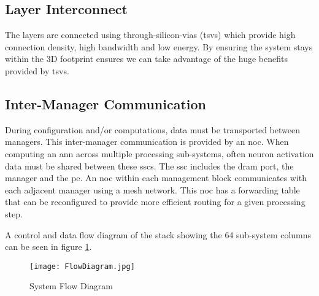 \subsection{Layer Interconnect}
\label{ssec:Layer Interconnect}

The layers are connected using through-silicon-vias (\ac{tsv}s) which provide high connection density, high bandwidth and low energy.
By ensuring the system stays within the 3D footprint ensures we can take advantage of the huge benefits provided by \ac{tsv}s.

\subsection{Inter-Manager Communication}
\label{ssec:Inter-Manager Communication}

During configuration and/or computations, data must be transported between managers. This inter-manager communication is provided by an \ac{noc}.
When computing an \ac{ann} across multiple processing sub-systems, often neuron activation data must be shared between these \ac{ssc}s. The \ac{ssc} includes the \ac{dram} port, the manager and the \ac{pe}. An \ac{noc} within each management block communicates with each adjacent manager using a mesh network. This \ac{noc} has a forwarding table that can be reconfigured to provide more efficient routing for a given processing step.

A control and data flow diagram of the stack showing the 64 sub-system columns can be seen in figure \ref{fig:FlowDiagram}.
\begin{figure}[!t]
\centering
\captionsetup{justification=centering}
\centerline{
\mbox{\texttt{[image: FlowDiagram.jpg]}}
}
\center\caption{System Flow Diagram}
\label{fig:FlowDiagram}
\end{figure}


